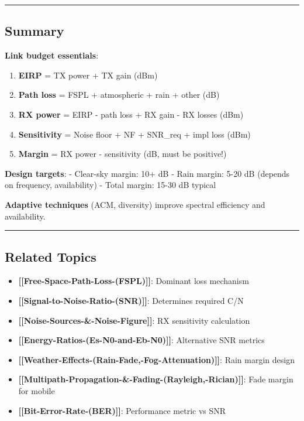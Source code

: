 \begin{center}\rule{0.5\linewidth}{0.5pt}\end{center}

\subsection{Summary}\label{summary}

\textbf{Link budget essentials}:

\begin{enumerate}
\def\labelenumi{\arabic{enumi}.}
\tightlist
\item
  \textbf{EIRP} = TX power + TX gain (dBm)
\item
  \textbf{Path loss} = FSPL + atmospheric + rain + other (dB)
\item
  \textbf{RX power} = EIRP - path loss + RX gain - RX losses (dBm)
\item
  \textbf{Sensitivity} = Noise floor + NF + SNR\_req + impl loss (dBm)
\item
  \textbf{Margin} = RX power - sensitivity (dB, must be positive!)
\end{enumerate}

\textbf{Design targets}: - Clear-sky margin: 10+ dB - Rain margin: 5-20
dB (depends on frequency, availability) - Total margin: 15-30 dB typical

\textbf{Adaptive techniques} (ACM, diversity) improve spectral
efficiency and availability.

\begin{center}\rule{0.5\linewidth}{0.5pt}\end{center}

\subsection{Related Topics}\label{related-topics}

\begin{itemize}
\tightlist
\item
  \textbf{{[}{[}Free-Space-Path-Loss-(FSPL){]}{]}}: Dominant loss
  mechanism
\item
  \textbf{{[}{[}Signal-to-Noise-Ratio-(SNR){]}{]}}: Determines required
  C/N
\item
  \textbf{{[}{[}Noise-Sources-\&-Noise-Figure{]}{]}}: RX sensitivity
  calculation
\item
  \textbf{{[}{[}Energy-Ratios-(Es-N0-and-Eb-N0){]}{]}}: Alternative SNR
  metrics
\item
  \textbf{{[}{[}Weather-Effects-(Rain-Fade,-Fog-Attenuation){]}{]}}:
  Rain margin design
\item
  \textbf{{[}{[}Multipath-Propagation-\&-Fading-(Rayleigh,-Rician){]}{]}}:
  Fade margin for mobile
\item
  \textbf{{[}{[}Bit-Error-Rate-(BER){]}{]}}: Performance metric vs SNR
\end{itemize}

